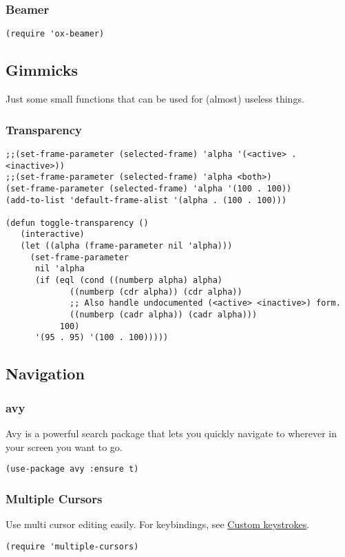\documentclass[11pt]{article}
\begin{document}
\subsubsection{Beamer}
\label{sec:org1a7ac2e}
\begin{verbatim}
(require 'ox-beamer)
\end{verbatim}
\subsection{Gimmicks}
\label{sec:orgd741de4}
Just some small functions that can be used for (almost) useless things.
\subsubsection{Transparency}
\label{sec:orgd939ef6}
\begin{verbatim}
;;(set-frame-parameter (selected-frame) 'alpha '(<active> . <inactive>))
;;(set-frame-parameter (selected-frame) 'alpha <both>)
(set-frame-parameter (selected-frame) 'alpha '(100 . 100))
(add-to-list 'default-frame-alist '(alpha . (100 . 100)))

(defun toggle-transparency ()
   (interactive)
   (let ((alpha (frame-parameter nil 'alpha)))
     (set-frame-parameter
      nil 'alpha
      (if (eql (cond ((numberp alpha) alpha)
		     ((numberp (cdr alpha)) (cdr alpha))
		     ;; Also handle undocumented (<active> <inactive>) form.
		     ((numberp (cadr alpha)) (cadr alpha)))
	       100)
	  '(95 . 95) '(100 . 100)))))
\end{verbatim}
\subsection{Navigation}
\label{sec:orgd5d1af9}
\subsubsection{avy}
\label{sec:org40c0a3c}
Avy is a powerful search package that lets you quickly navigate to wherever in your screen you want to go.
\begin{verbatim}
(use-package avy :ensure t)
\end{verbatim}
\subsubsection{Multiple Cursors}
\label{sec:org42ed92e}
Use multi cursor editing easily. For keybindings, see \hyperref[sec:org25ccc0c]{Custom keystrokes}.
\begin{verbatim}
(require 'multiple-cursors)
\end{verbatim}
\end{document}
